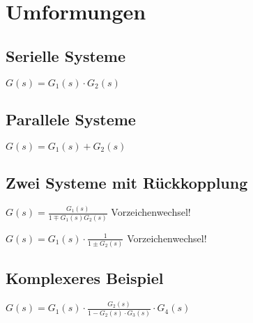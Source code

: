 \section{Umformungen}
	\subsection{Serielle Systeme}
		
		$G(s) = G_1(s) \cdot G_2(s)$
	\subsection{Parallele Systeme}
		
		$G(s) = G_1(s) + G_2(s)$
	\subsection{Zwei Systeme mit Rückkopplung}
		\begin{multicols}{2}
		\newline
		$G(s) = \frac{G_1(s)}{1 \mp G_1(s) G_2(s)}$ Vorzeichenwechsel!
		\columnbreak
		
		\newline
		$G(s) = G_1(s) \cdot \frac{1}{1 \pm G_2(s)}$ Vorzeichenwechsel!
		
		\end{multicols}
	\subsection{Komplexeres Beispiel}
		
		$G(s) = G_1(s) \cdot \frac{G_2(s)}{1-G_2(s) \cdot G_3(s)} \cdot G_4(s)$
